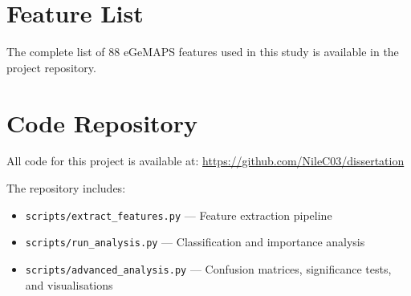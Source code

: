 \documentclass{l4proj}
\begin{document}













\appendix

\chapter{Feature List}
The complete list of 88 eGeMAPS features used in this study is available in the project repository.

\chapter{Code Repository}
All code for this project is available at: \url{https://github.com/NileC03/dissertation}

The repository includes:
\begin{itemize}
    \item \texttt{scripts/extract\_features.py} — Feature extraction pipeline
    \item \texttt{scripts/run\_analysis.py} — Classification and importance analysis
    \item \texttt{scripts/advanced\_analysis.py} — Confusion matrices, significance tests, and visualisations
\end{itemize}
\end{document}
